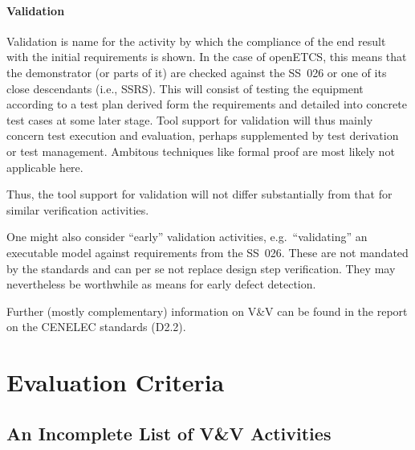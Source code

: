 \documentclass{template/openetcs_article}
\begin{document}
\paragraph{Validation}
Validation is name for the activity by which the compliance of the end
result with the initial requirements is shown. In the case of
openETCS, this means that the demonstrator (or parts of it) are
checked against the SS~026 or one of its close descendants (i.e.,
SSRS). This will consist of testing the equipment according to a test
plan derived form the requirements and detailed into concrete test
cases at some later stage. Tool support for validation will thus
mainly concern test execution and evaluation, perhaps supplemented by
test derivation or test management. Ambitous techniques like formal
proof are most likely not applicable here.

Thus, the tool support for validation will not differ substantially
from that for similar verification activities.

One might also consider ``early'' validation activities, e.g.\
``validating'' an executable model against requirements from the
SS~026. These are not mandated by the standards and can per se not
replace design step verification. They may nevertheless be worthwhile
as means for early defect detection.

Further (mostly complementary) information on V\&V can be found in the
report on the CENELEC standards (D2.2).


\section{Evaluation Criteria}




\subsection{An Incomplete List of V\&V Activities}
\label{sec:table-verif-activ}
\end{document}
